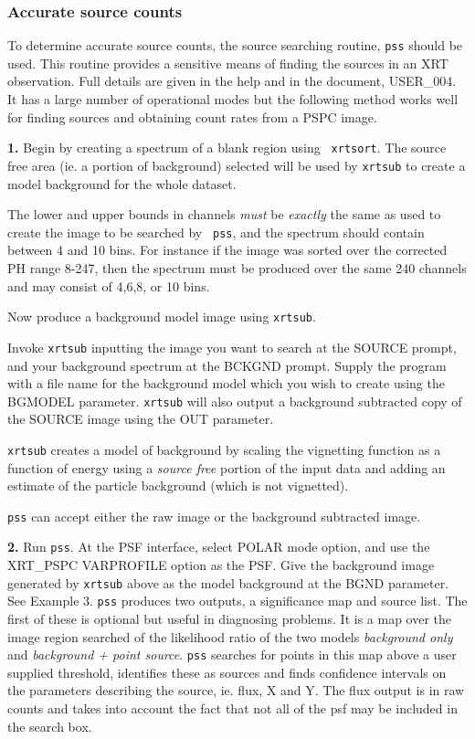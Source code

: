 \documentclass[11pt,fleqn]{article}    %
\begin{document}
\subsubsection{Accurate source counts}

To determine accurate source counts, the source searching routine, 
{\tt pss} should be used. This routine provides a sensitive means of 
finding the sources in an XRT observation. 
Full details are given in the help and in the document,
USER\_004. It has a large number of operational modes but the
following method works well for finding sources and obtaining count rates
from a PSPC image.

{\bf 1.}  Begin by creating a  spectrum of a  blank  region using {\tt
xrtsort}. The source free area  (ie. a portion of background) selected
will  be used by {\tt  xrtsub}  to create  a model  background for the
whole dataset.

The lower  and upper bounds  in channels {\em must} be {\em
exactly} the same as used  to create the  image to be searched by {\tt
pss}, and  the  spectrum should contain   between 4 and 10   bins. For
instance if  the image was sorted over  the corrected PH  range 8-247,
then the spectrum must be produced over  the same 240 channels and may
consist of 4,6,8, or 10 bins.

Now produce a background model image using {\tt xrtsub}.

Invoke {\tt  xrtsub}  inputting the  image you want  to  search at the
SOURCE   prompt,  and your      background  spectrum at  the    BCKGND
prompt. Supply the program with a file name for the background  model which you wish
to create using the BGMODEL parameter.  {\tt  xrtsub} will also output
a  background subtracted copy  of   the SOURCE  image  using the   OUT
parameter.

{\tt xrtsub}  creates a model of  background by scaling the vignetting
function as a function of energy using  a {\em source free} portion of
the  input  data and  adding an estimate   of  the particle background
(which is not vignetted).

{\tt pss} can accept either the raw image or the background subtracted
image.

{\bf 2.}  Run  {\tt  pss}.  At the  PSF  interface, select POLAR  mode
option, and use  the XRT\_PSPC VARPROFILE option as  the PSF. Give the
background    image generated  by  {\tt  xrtsub}   above  as the model
background at  the BGND parameter.  See Example 3.  {\tt pss} produces
two  outputs, a significance map and  source list.  The first of these
is optional  but useful in diagnosing problems.   It is a map over the
image region searched  of the likelihood ratio  of the two models {\em
background  only} and {\em   background  + point source}.   {\tt  pss}
searches  for  points  in this map  above   a user supplied threshold,
identifies  these as sources   and finds confidence  intervals on  the
parameters describing the source, ie.  flux, X and Y.  The flux output
is in raw counts and takes  into account the fact  that not all of the
psf may be included in the search box.
\end{document}
